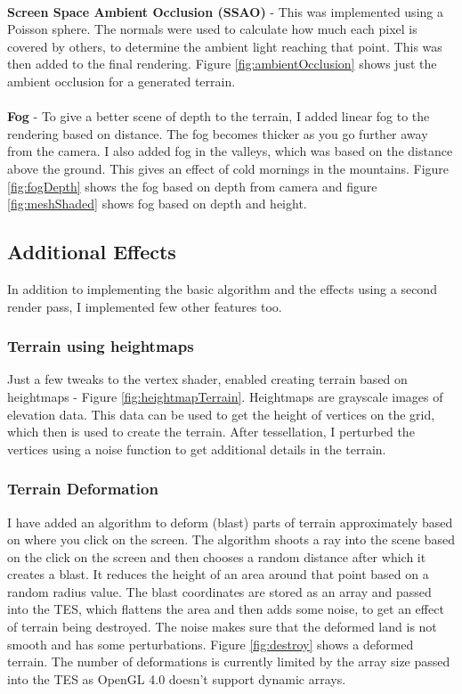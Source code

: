 \documentclass[annual]{acmsiggraph}
\begin{document}
\paragraph*{}
\textbf{Screen Space Ambient Occlusion (SSAO)} - This was implemented using a Poisson sphere. The normals were used to calculate how much each pixel is covered by others, to determine the ambient light reaching that point. This was then added to the final rendering. Figure \ref{fig:ambientOcclusion} shows just the ambient occlusion for a generated terrain.

\paragraph*{}
\textbf{Fog} - To give a better scene of depth to the terrain, I added linear fog to the rendering based on distance. The fog becomes thicker as you go further away from the camera. I also added fog in the valleys, which was based on the distance above the ground. This gives an effect of cold mornings in the mountains. Figure \ref{fig:fogDepth} shows the fog based on depth from camera and figure \ref{fig:meshShaded} shows fog based on depth and height.

\subsection{Additional Effects}
In addition to implementing the basic algorithm and the effects using a second render pass, I implemented few other features too.

\subsubsection*{Terrain using heightmaps}
Just a few tweaks to the vertex shader, enabled creating terrain based on heightmaps - Figure \ref{fig:heightmapTerrain}. Heightmaps are grayscale images of elevation data. This data can be used to get the height of vertices on the grid, which then is used to create the terrain. After tessellation, I perturbed the vertices using a noise function to get additional details in the terrain.

\subsubsection*{Terrain Deformation}
I have added an algorithm to deform (blast) parts of terrain approximately based on where you click on the screen. The algorithm shoots a ray into the scene based on the click on the screen and then chooses a random distance after which it creates a blast. It reduces the height of an area around that point based on a random radius value. The blast coordinates are stored as an array and passed into the TES, which flattens the area and then adds some noise, to get an effect of terrain being destroyed. The noise makes sure that the deformed land is not smooth and has some perturbations. Figure \ref{fig:destroy} shows a deformed terrain. The number of deformations is currently limited by the array size passed into the TES as OpenGL 4.0 doesn't support dynamic arrays.
\end{document}
